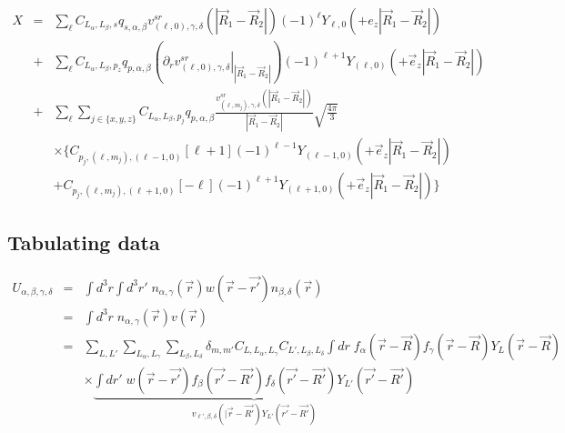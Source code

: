 \documentclass[11pt,a4paper]{report}
\begin{document}
\begin{eqnarray}
X&=&\sum_\ell C_{L_\alpha,L_\beta,s}q_{s,\alpha,\beta}
v^{sr}_{(\ell,0),\gamma,\delta}(|\vec{R}_1-\vec{R}_2|)
(-1)^{\ell}
Y_{\ell,0}(+e_z|\vec{R}_1-\vec{R}_2|)
\nonumber\\
%
&+&\sum_\ell C_{L_\alpha,L_\beta,p_z}q_{p,\alpha,\beta}
\left(\left.\partial_rv^{sr}_{(\ell,0),\gamma,\delta}\right|_{|\vec{R}_1-\vec{R}_2|}\right)
(-1)^{\ell+1}Y_{(\ell,0)}(+\vec{e}_z|\vec{R}_1-\vec{R}_2|)
\nonumber\\
%
&+&\sum_{\ell} \sum_{j\in \{x,y,z\}} C_{L_\alpha,L_\beta,p_j}q_{p,\alpha,\beta}
\frac{v^{sr}_{(\ell,m_j),\gamma,\delta}(|\vec{R}_1-\vec{R}_2|)}
{|\vec{R}_1-\vec{R}_2|}
\sqrt{\frac{4\pi}{3}}
\nonumber\\
&&
\times\biggl\lbrace
C_{p_j,(\ell,m_j),(\ell-1,0)}
\left[\ell+1\right]
(-1)^{\ell-1}Y_{(\ell-1,0)}(+\vec{e}_z|\vec{R}_1-\vec{R}_2|)
\nonumber\\
&&+
C_{p_j,(\ell,m_j),(\ell+1,0)}
\left[-\ell\right]
(-1)^{\ell+1}Y_{(\ell+1,0)}(+\vec{e}_z|\vec{R}_1-\vec{R}_2|)
\biggr\rbrace
\end{eqnarray}



\subsection{Tabulating data}
\begin{eqnarray}
U_{\alpha,\beta,\gamma,\delta}
&=&
\int d^3r\int d^3r'\; n_{\alpha,\gamma}(\vec{r}) w(\vec{r}-\vec{r'}) n_{\beta,\delta}(\vec{r})
\nonumber\\
&=&
\int d^3r\; n_{\alpha,\gamma}(\vec{r}) v(\vec{r})
\nonumber\\
&=&\sum_{L,L'}\sum_{L_\alpha,L_\gamma}\sum_{L_\beta,L_\delta}\delta_{m,m'}
C_{L,L_\alpha,L_\gamma}C_{L',L_\beta,L_\delta}
\int dr\; 
f_{\alpha}(\vec{r}-\vec{R})f_{\gamma}(\vec{r}-\vec{R}) Y_L(\vec{r}-\vec{R})
\nonumber\\
&&\times
\underbrace{
\int dr'\; w(\vec{r}-\vec{r'})
f_{\beta}(\vec{r'}-\vec{R'})f_{\delta}(\vec{r'}-\vec{R'}) Y_{L'}(\vec{r'}-\vec{R'})
}_{v_{\ell',\beta,\delta}(|\vec{r}-\vec{R'})Y_{L'}(\vec{r'}-\vec{R'})}
\end{eqnarray}
\end{document}

